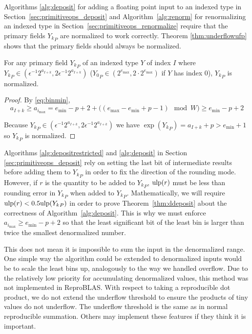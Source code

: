       Algorithms \ref{alg:deposit} for adding a floating point input to an
      indexed type in Section~\ref{sec:primitiveops_deposit} and
      Algorithm~\ref{alg:renorm} for renormalizing an indexed type in
      Section~\ref{sec:primitiveops_renormalize} require that the primary
      fields ${Y_k}_P$ are normalized to work correctly. Theorem
      \ref{thm:underflowufp} shows that the primary fields should always be
      normalized.

      \begin{samepage}
      \begin{thm}
        For any primary field ${Y_k}_P$ of an indexed type $Y$ of index $I$ where ${Y_k}_P \in (\epsilon^{-1} 2^{a_{I + k}}, 2 \epsilon^{-1} 2^{a_{I + k}})$ (${Y_0}_P \in (2^{e_{\max}}, 2 \cdot 2^{e_{\max}})$ if $Y$ has index 0), ${Y_k}_P$ is normalized.
        \label{thm:underflowufp}
      \end{thm}
      \end{samepage}

      \begin{proof}
        By \eqref{eq:binmin},
        \[
        a_{I + k} \geq a_{i_{\max}} = e_{\min} - p + 2 + \bigl((e_{\max} - e_{\min} + p - 1) \mod W\bigr) \geq e_{\min} - p + 2
        \]

        Because ${Y_k}_P \in (\epsilon^{-1} 2^{a_{I + k}}, 2 \epsilon^{-1} 2^{a_{I + k}})$ we have $\exp({Y_k}_P) = a_{I + k} + p > e_{\min} + 1$ so ${Y_k}_P$ is normalized.
      \end{proof}

      Algorithms \ref{alg:depositrestricted} and \ref{alg:deposit} in Section \ref{sec:primitiveops_deposit} rely on
      setting the last bit of intermediate results before adding them to
      ${Y_k}_P$ in order to fix the direction of the rounding mode. However, if
      $r$ is the quantity to be added to ${Y_k}_P$, $\text{ulp}(r)$ must be less than
      rounding error in ${Y_k}_P$ when added to ${Y_k}_P$.
      Mathematically, we will require $\text{ulp}(r) < 0.5\text{ulp}({Y_k}_P)$ in order to
      prove Theorem~\ref{thm:ddeposit} about the correctness of
      Algorithm~\ref{alg:deposit}.  This is why we must enforce $a_{i_{\max}}
      \geq e_{\min} - p + 2$ so that the least significant bit of the least bin
      is larger than twice the smallest denormalized number.

      This does not mean it is impossible to sum the input in the denormalized range. One simple way
      the algorithm could be extended to denormalized inputs would be to scale
      the least bins up, analogously to the way we handled overflow. Due to the
      relatively low priority for accumulating denormalized values, this method
      was not implemented in ReproBLAS. With respect to taking a reproducible dot product, we do not extend the underflow threshold to ensure the products of tiny values do not underflow. The underflow threshold is the same as in normal reproducible summation. Others may implement these features if they think it is important.



